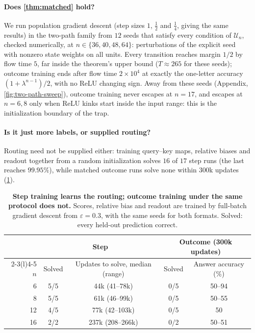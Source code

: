 \paragraph{Does \cref{thm:matched} hold?} We run population gradient descent (step sizes $1$, $\tfrac12$ and $\tfrac14$, giving the
same results) in the two-path family from $12$ seeds that satisfy every condition of $\mathcal U_n$, checked numerically, at
$n\in\{36,40,48,64\}$: perturbations of the explicit seed with nonzero state weights on all units. Every transition
reaches margin $1/2$ by flow time $5$, far inside the theorem's upper bound ($T\approx265$ for these seeds); outcome
training ends after flow time $2\times10^4$ at exactly the one-letter accuracy $(1+\lambda^{n-1})/2$, with no ReLU changing
sign. Away from these seeds (Appendix, \cref{fig:two-path-sweep}), outcome training never escapes at $n=17$, and escapes
at $n=6,8$ only when ReLU kinks start inside the input range: this is the initialization boundary of the trap.

\paragraph{Is it just more labels, or supplied routing?}  Routing need not be
supplied either: training query--key maps, relative biases and readout together from a random initialization solves $16$
of $17$ step runs (the last reaches $99.95\%$), while matched outcome runs solve none within $300$k updates
(\cref{tab:reach}).

\begin{table}[t]
\caption{\textbf{Step training learns the routing; outcome training under the same protocol does not.}
Scores, relative bias and readout are trained by full-batch gradient descent from $\varepsilon=0.3$, with the same seeds for both
formats. Solved: every held-out prediction correct.}
\label{tab:reach}
\centering\small
\begin{tabular}{@{}rcccc@{}}
\toprule
 & \multicolumn{2}{c}{Step} & \multicolumn{2}{c}{Outcome (300k updates)}\\
\cmidrule(lr){2-3}\cmidrule(l){4-5}
$n$ & Solved & Updates to solve, median (range) & Solved & Answer accuracy (\%)\\
\midrule
6  & 5/5 & 44k (41--78k)   & 0/5 & 50--94\\
8  & 5/5 & 61k (46--99k)   & 0/5 & 50--55\\
12 & 4/5 & 77k (42--103k)  & 0/5 & 50\\
16 & 2/2 & 237k (208--266k) & 0/2 & 50--51\\
\bottomrule
\end{tabular}
\end{table}

